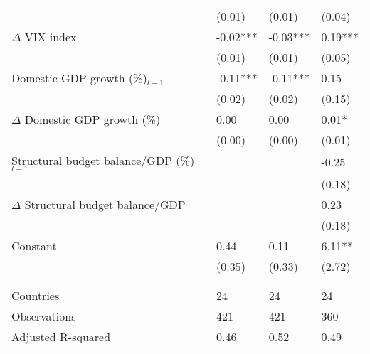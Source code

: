{\begin{tabular}{lp{2cm}p{2cm}p{2cm}}
   & (0.01) & (0.01) & (0.04) \\ 
  $\Delta$ VIX index & -0.02*** & -0.03*** & 0.19*** \\ 
   & (0.01) & (0.01) & (0.05) \\ 
  Domestic GDP growth (\%)$_{t-1}$ & -0.11*** & -0.11*** & 0.15 \\ 
   & (0.02) & (0.02) & (0.15) \\ 
  $\Delta$ Domestic GDP growth (\%) & 0.00 & 0.00 & 0.01* \\ 
   & (0.00) & (0.00) & (0.01) \\ 
  Structural budget balance/GDP (\%)$_{t-1}$ &  &  & -0.25 \\ 
   &  &  & (0.18) \\ 
  $\Delta$ Structural budget balance/GDP &  &  & 0.23 \\ 
   &  &  & (0.18) \\ 
  Constant & 0.44 & 0.11 & 6.11** \\ 
   & (0.35) & (0.33) & (2.72) \\ 
   &  &  &  \\ 
   &  &  &  \\ 
  Countries & 24 & 24 & 24 \\ 
  Observations & 421 & 421 & 360 \\ 
  Adjusted R-squared & 0.46 & 0.52 & 0.49 \\ 
   \hline
\end{tabular}
}
